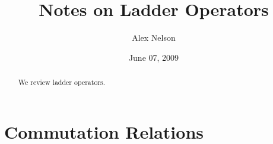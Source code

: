 \documentclass{amsart}
\title{Notes on Ladder Operators}
\date{June 07, 2009}
\author{Alex Nelson}
\numberwithin{equation}{section}
\theoremstyle{definition}
\begin{document}
\begin{abstract}
We review ladder operators.
\end{abstract}
\maketitle
\section{Commutation Relations}


\nocite{*}


\end{document}
